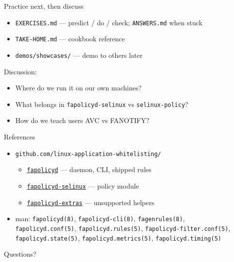 \documentclass[aspectratio=169,11pt]{beamer}
\begin{document}
\begin{frame}{Practice next, then discuss}
  \begin{itemize}
    \item \texttt{EXERCISES.md} --- predict / do / check; \texttt{ANSWERS.md} when stuck
    \item \texttt{TAKE-HOME.md} --- cookbook reference
    \item \texttt{demos/showcases/} --- demo to others later
  \end{itemize}
  \vspace{0.6em}
  Discussion:
  \begin{itemize}
    \item Where do we run it on our own machines?
    \item What belongs in \texttt{fapolicyd-selinux} vs \texttt{selinux-policy}?
    \item How do we teach users AVC vs FANOTIFY?
  \end{itemize}
\end{frame}

\begin{frame}{References}
  \begin{itemize}
    \item \texttt{github.com/linux-application-whitelisting/}
          \begin{itemize}
            \item \href{https://github.com/linux-application-whitelisting/fapolicyd}{\texttt{fapolicyd}}
                  --- daemon, CLI, shipped rules
            \item \href{https://github.com/linux-application-whitelisting/fapolicyd-selinux}{\texttt{fapolicyd-selinux}}
                  --- policy module
            \item \href{https://github.com/linux-application-whitelisting/fapolicyd-extras}{\texttt{fapolicyd-extras}}
                  --- unsupported helpers
          \end{itemize}
    \item man: \texttt{fapolicyd(8)}, \texttt{fapolicyd-cli(8)}, \texttt{fagenrules(8)},\\
          \texttt{fapolicyd.conf(5)}, \texttt{fapolicyd.rules(5)},
          \texttt{fapolicyd-filter.conf(5)},\\
          \texttt{fapolicyd.state(5)}, \texttt{fapolicyd.metrics(5)},
          \texttt{fapolicyd.timing(5)}
  \end{itemize}
\end{frame}

\begin{frame}[standout]
  Questions?
\end{frame}
\end{document}
